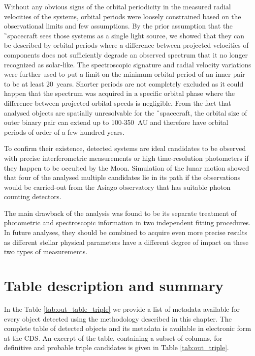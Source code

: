 Without any obvious signs of the orbital periodicity in the measured radial velocities of the systems, orbital periods were loosely constrained based on the observational limits and few assumptions. By the prior assumption that the \G\ spacecraft sees those systems as a single light source, we showed that they can be described by orbital periods where a difference between projected velocities of components does not sufficiently degrade an observed spectrum that it no longer recognized as solar-like. The spectroscopic signature and radial velocity variations were further used to put a limit on the minimum orbital period of an inner pair to be at least 20~years. Shorter periods are not completely excluded as it could happen that the spectrum was acquired in a specific orbital phase where the difference between projected orbital speeds is negligible. From the fact that analysed objects are spatially unresolvable for the \G\ spacecraft, the orbital size of outer binary pair can extend up to 100-350~AU and therefore have orbital periods of order of a few hundred years.

To confirm their existence, detected systems are ideal candidates to be observed with precise interferometric measurements or high time-resolution photometers if they happen to be occulted by the Moon. Simulation of the lunar motion showed that four of the analysed multiple candidates lie in its path if the observations would be carried-out from the Asiago observatory that has suitable photon counting detectors.

The main drawback of the analysis was found to be its separate treatment of photometric and spectroscopic information in two independent fitting procedures. In future analyses, they should be combined to acquire even more precise results as different stellar physical parameters have a different degree of impact on these two types of measurements.


\section{Table description and summary}
\label{sec:outres}

In the Table \ref{tab:out_table_triple} we provide a list of metadata available for every object detected using the methodology described in this chapter. The complete table of detected objects and its metadata is available in electronic form at the CDS. An excerpt of the table, containing a subset of columns, for definitive and probable triple candidates is given in Table \ref{tab:out_triple}.


